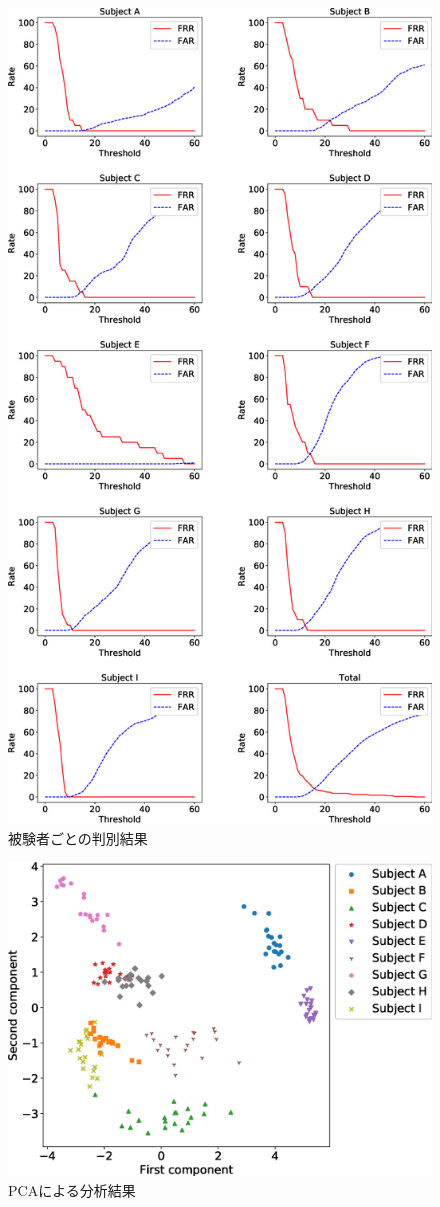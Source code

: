 \begin{figure}[!t]
  \centering
    \includegraphics[width=0.70\linewidth]{figure/EER.eps}
  \caption{被験者ごとの判別結果}
  \label{EER}
\end{figure}

\begin{figure}[!t]
  \centering
    \includegraphics[width=1\linewidth]{figure/PCA.eps}
  \caption{PCAによる分析結果}
  \label{PCA}
\end{figure}